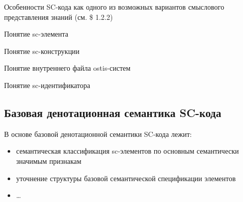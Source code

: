 Особенности SC-кода как одного из возможных
вариантов смыслового представления знаний 
(см. \$ 1.2.2) 

Понятие sc-элемента 

Понятие sc-конструкции 

Понятие внутреннего файла ostis-систем 

Понятие sc-идентификатора

\begin{SCn}
	\section{Базовая денотационная семантика SC-кода}
	\label{sec_sr_scdsemantics}
	В основе базовой денотационной семантики
	SC-кода лежит:
	\begin{itemize} 
		\item семантическая классификация sc-элементов по
		основным семантически значимым признакам 
		\item уточнение структуры базовой семантической
		спецификации элементов
		\item …
	\end{itemize}
\end{SCn}


